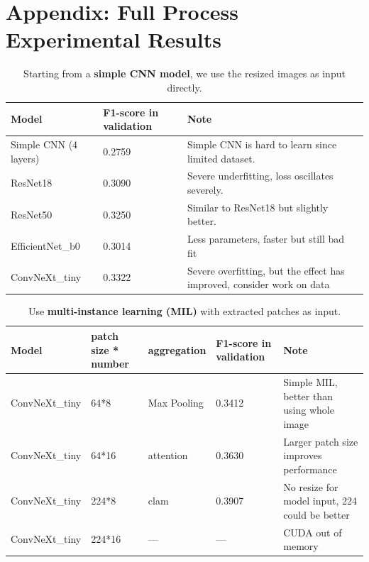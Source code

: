 \documentclass[11pt]{article}
\begin{document}
\section{Appendix: Full Process Experimental Results}\label{sec:appendix}
\begin{table}[h]
    \centering
    \setlength{\tabcolsep}{3pt}
    \caption{Starting from a \textbf{simple CNN model}, we use the resized images as input directly.}
    \begin{tabularx}{\textwidth}{lYYY}
        \toprule
        Model                 & F1-score in validation & Note                                                                   \\
        \midrule
        Simple CNN (4 layers) & 0.2759                 & Simple CNN is hard to learn since limited dataset.                     \\
        ResNet18              & 0.3090                 & Severe underfitting, loss oscillates severely.                         \\
        ResNet50              & 0.3250                 & Similar to ResNet18 but slightly better.                               \\
        EfficientNet\_b0      & 0.3014                 & Less parameters, faster but still bad fit                              \\
        ConvNeXt\_tiny        & 0.3322                 & Severe overfitting, but the effect has improved, consider work on data \\
        \bottomrule
    \end{tabularx}
\end{table}

\begin{table}[h]
    \centering
    \setlength{\tabcolsep}{3pt}
    \caption{Use \textbf{multi-instance learning (MIL)} with extracted patches as input.}
    \begin{tabularx}{\textwidth}{lYYYY}
        \toprule
        Model          & patch size * number & aggregation & F1-score in validation & Note                                           \\
        \midrule
        ConvNeXt\_tiny & 64*8                & Max Pooling & 0.3412                 & Simple MIL, better than using whole image      \\
        ConvNeXt\_tiny & 64*16               & attention   & 0.3630                 & Larger patch size improves performance         \\
        ConvNeXt\_tiny & 224*8               & clam        & 0.3907                 & No resize for model input, 224 could be better \\
        ConvNeXt\_tiny & 224*16              & ---         & ---                    & CUDA out of memory                             \\
        \bottomrule
    \end{tabularx}
\end{table}
\end{document}
